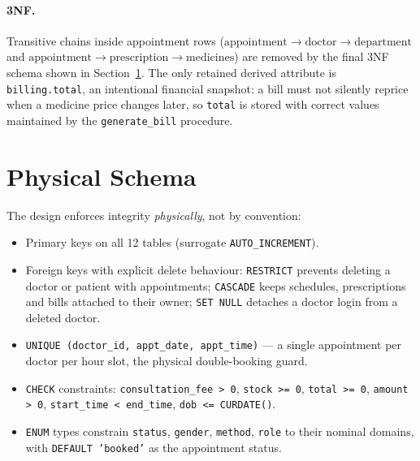 \documentclass[11pt]{article}
\begin{document}
\paragraph{3NF.} Transitive chains inside appointment rows
($\text{appointment} \rightarrow \text{doctor} \rightarrow \text{department}$
and $\text{appointment} \rightarrow \text{prescription} \rightarrow \text{medicines}$)
are removed by the final 3NF schema shown in Section~\ref{sec:physical}.
The only retained derived attribute is \texttt{billing.total}, an intentional
financial snapshot: a bill must not silently reprice when a medicine price
changes later, so \texttt{total} is stored with correct values maintained by
the \texttt{generate\_bill} procedure.

\section{Physical Schema}\label{sec:physical}

The design enforces integrity \emph{physically}, not by convention:

\begin{itemize}
  \item Primary keys on all 12 tables (surrogate \texttt{AUTO\_INCREMENT}).
  \item Foreign keys with explicit delete behaviour:
        \texttt{RESTRICT} prevents deleting a doctor or patient with
        appointments; \texttt{CASCADE} keeps schedules, prescriptions and
        bills attached to their owner; \texttt{SET NULL} detaches a doctor
        login from a deleted doctor.
  \item \texttt{UNIQUE (doctor\_id, appt\_date, appt\_time)} --- a single
        appointment per doctor per hour slot, the physical double-booking
        guard.
  \item \texttt{CHECK} constraints:
        \texttt{consultation\_fee > 0}, \texttt{stock >= 0},
        \texttt{total >= 0}, \texttt{amount > 0},
        \texttt{start\_time < end\_time}, \texttt{dob <= CURDATE()}.
  \item \texttt{ENUM} types constrain \texttt{status},
        \texttt{gender}, \texttt{method}, \texttt{role} to their
        nominal domains, with \texttt{DEFAULT 'booked'} as the
        appointment status.
\end{itemize}
\end{document}
